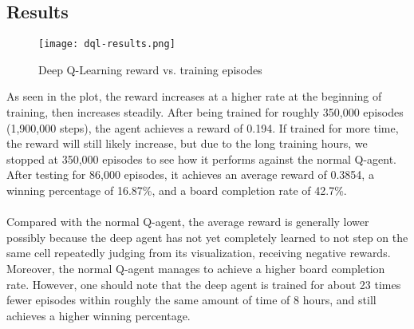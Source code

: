 \subsection{Results}

\begin{figure}[H]
\centering
\texttt{[image: dql-results.png]}
\caption{Deep Q-Learning reward vs. training episodes}
\end{figure}
As seen in the plot, the reward increases at a higher rate at the beginning of training, then increases steadily. After being trained for roughly 350,000 episodes (1,900,000 steps), the agent achieves a reward of 0.194. If trained for more time, the reward will still likely increase, but due to the long training hours, we stopped at 350,000 episodes to see how it performs against the normal Q-agent. After testing for 86,000 episodes, it achieves an average reward of 0.3854, a winning percentage of 16.87\%, and a board completion rate of 42.7\%.
\\\\
Compared with the normal Q-agent, the average reward is generally lower possibly because the deep agent has not yet completely learned to not step on the same cell repeatedly judging from its visualization, receiving negative rewards. Moreover, the normal Q-agent manages to achieve a higher board completion rate. However, one should note that the deep agent is trained for about 23 times fewer episodes within roughly the same amount of time of 8 hours, and still achieves a higher winning percentage. 
